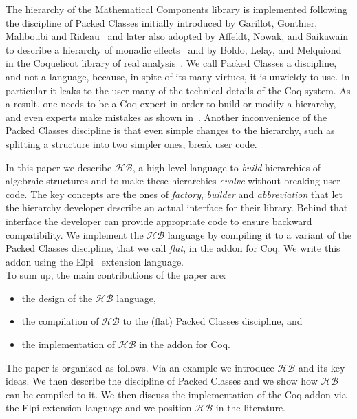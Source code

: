 \documentclass[a4paper,UKenglish,cleveref, autoref]{lipics-v2019}
\newcommand{\HB}{\ensuremath{\mathcal{HB}}}
\newcommand{\hb}{\coq{hierarchy-builder}}
\newcommand{\factory}{factory}
\newcommand{\phantterm}{abbreviation}
\newcommand{\builder}{builder}
\theoremstyle{implem}
\theoremstyle{implem}
\theoremstyle{command}
\theoremstyle{commands}
\begin{document}
The hierarchy of the Mathematical Components library
is implemented following the discipline of Packed Classes initially introduced
by Garillot, Gonthier, Mahboubi and Rideau~\cite{DBLP:conf/tphol/GarillotGMR09}
and later also adopted by Affeldt, Nowak, and Saikawain
to describe a hierarchy of monadic effects~\cite{DBLP:conf/mpc/AffeldtNS19}
and by Boldo, Lelay, and Melquiond in the Coquelicot library of real
analysis~\cite{DBLP:journals/mics/BoldoLM15}.
We call Packed Classes a discipline, and not a language, because, in spite of
its many virtues, it is unwieldy to use. In particular it leaks to the user
many of the technical details of the Coq system. As a result, one
needs to be a Coq expert in order to build or modify a hierarchy, and even
experts make mistakes as shown in~\cite{KSdraft}.
Another inconvenience of the Packed Classes discipline is that even
simple changes to the hierarchy, such as splitting a structure into
two simpler ones, break user code.

In this paper we describe \HB{}, a high level language
to \emph{build} hierarchies of algebraic structures and to make these hierarchies
\emph{evolve} without breaking user code. The key concepts are the ones of
\emph{\factory{}}, \emph{\builder{}} and \emph{\phantterm{}} that let the hierarchy developer describe an actual
interface for their library. Behind that interface the developer can provide
appropriate code to ensure backward compatibility.
We implement the \HB{} language by compiling it
to a variant of the Packed Classes discipline, that we call \emph{flat},
in the \hb{} addon for Coq. We write this addon using the
Elpi~\cite{DBLP:conf/lpar/DunchevGCT15,CoqElpi} extension language.\\

\noindent To sum up, the main contributions of the paper are:
\begin{itemize}
\item the design of the \HB{} language,
\item the compilation of \HB{} to the (flat) Packed Classes discipline, and
\item the implementation of \HB{} in the \hb{} addon for Coq.
\end{itemize}
The paper is organized as follows. Via an example we introduce
\HB{} and its key ideas. %
We then describe the discipline
of Packed Classes and we show how \HB{} can be compiled to it.
We then discuss the implementation of the Coq addon via the Elpi extension
language and we position \HB{} in the literature.
\end{document}
